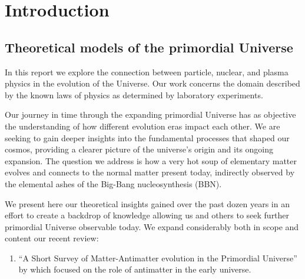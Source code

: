 \maketitle
\newpage
\setcounter{tocdepth}{2}
\tableofcontents

\section{Introduction}
\subsection{Theoretical models of the primordial Universe}\label{ssec:UniLab}
In this report we explore the connection between particle, nuclear, and plasma physics in the evolution of the Universe. Our work concerns the domain described by the known laws of physics as determined by laboratory experiments.

Our journey in time through the expanding primordial Universe has as objective the understanding of how different evolution eras impact each other. We are seeking to gain deeper insights into the fundamental processes that shaped our cosmos, providing a clearer picture of the universe's origin and its ongoing expansion. The question we address is how a very hot soup of elementary matter evolves and connects to the normal matter present today, indirectly observed by the elemental ashes of the Big-Bang nucleosynthesis (BBN). 

We present here our theoretical insights gained over the past dozen years in an effort to create a backdrop of knowledge allowing us and others to seek further primordial Universe observable today. We expand considerably both in scope and content our recent review:
\begin{enumerate}
\item ``A Short Survey of Matter-Antimatter evolution in the Primordial Universe'' by  which focused on the role of antimatter in the early universe. 
\end{enumerate}


